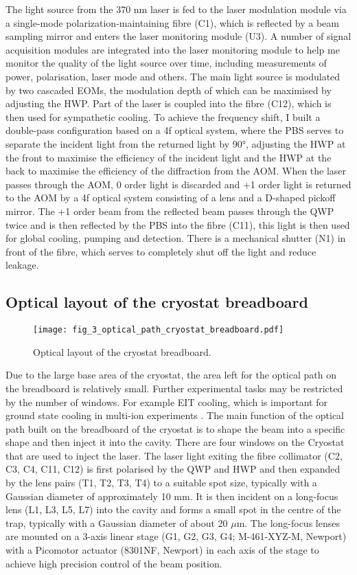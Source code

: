 The light source from the 370 nm laser is fed to the laser modulation module via a single-mode polarization-maintaining fibre (C1), which is reflected by a beam sampling mirror and enters the laser monitoring module (U3). A number of signal acquisition modules are integrated into the laser monitoring module to help me monitor the quality of the light source over time, including measurements of power, polarisation, laser mode and others. The main light source is modulated by two cascaded EOMs, the modulation depth of which can be maximised by adjusting the HWP. Part of the laser is coupled into the fibre (C12), which is then used for sympathetic cooling. To achieve the frequency shift, I built a double-pass configuration based on a 4f optical system, where the PBS serves to separate the incident light from the returned light by 90°, adjusting the HWP at the front to maximise the efficiency of the incident light and the HWP at the back to maximise the efficiency of the diffraction from the AOM. When the laser passes through the AOM, 0 order light is discarded and +1 order light is returned to the AOM by a 4f optical system consisting of a lens and a D-shaped pickoff mirror. The +1 order beam from the reflected beam passes through the QWP twice and is then reflected by the PBS into the fibre (C11), this light is then used for global cooling, pumping and detection. There is a mechanical shutter (N1) in front of the fibre, which serves to completely shut off the light and reduce leakage.

\subsection{Optical layout of the cryostat breadboard}

\begin{figure}
    \centering
    \texttt{[image: fig\_3\_optical\_path\_cryostat\_breadboard.pdf]}
    \caption{Optical layout of the cryostat breadboard.}
    \label{fig:fig_3_optical_path_cryostat_breadboard}
\end{figure}

Due to the large base area of the cryostat, the area left for the optical path on the breadboard is relatively small. Further experimental tasks may be restricted by the number of windows. For example EIT cooling, which is important for ground state cooling in multi-ion experiments \cite{RN155, RN7, RN35, RN54}. The main function of the optical path built on the breadboard of the cryostat is to shape the beam into a specific shape and then inject it into the cavity. There are four windows on the Cryostat that are used to inject the laser. The laser light exiting the fibre collimator (C2, C3, C4, C11, C12) is first polarised by the QWP and HWP and then expanded by the lens pairs (T1, T2, T3, T4) to a suitable spot size, typically with a Gaussian diameter of approximately 10 mm. It is then incident on a long-focus lens (L1, L3, L5, L7) into the cavity and forms a small spot in the centre of the trap, typically with a Gaussian diameter of about 20 $\mu$m. The long-focus lenses are mounted on a 3-axis linear stage (G1, G2, G3, G4; M-461-XYZ-M, Newport) with a Picomotor actuator (8301NF, Newport) in each axis of the stage to achieve high precision control of the beam position.

